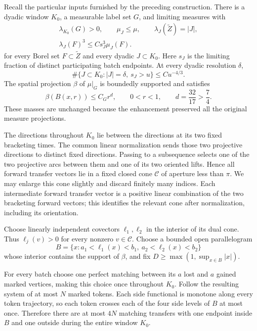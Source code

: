 Recall the particular inputs furnished by the preceding construction.
There is a dyadic window $K_0$, a measurable label set $G$, and limiting
measures with
\begin{equation}
 \begin{gathered}
 \lambda_{K_0}(G)>0,\qquad \mu_J\leq\mu,\qquad
 \lambda_J(\widetilde Z)=|J|,\\
 \lambda_J(F)^3\leq C s_J^3\mu_J(F).
 \end{gathered}
 \label{eq:boundary-measure-input}
\end{equation}
for every Borel set $F\subset\widetilde Z$ and every dyadic $J\subset K_0$.
Here $s_J$ is the limiting fraction of distinct participating batch
endpoints. At every dyadic resolution $\delta$,
\begin{equation}
 \#\{J\subset K_0:|J|=\delta,\ s_J>u\}
 \leq C u^{-4/3}.
 \label{eq:boundary-packing-input}
\end{equation}
The spatial projection $\beta$ of $\mu|_G$ is boundedly supported and
satisfies
\begin{equation}
 \beta(B(x,r))\leq C_G r^d,
 \qquad 0<r<1,
 \qquad d=\frac{32}{17}>\frac74.
 \label{eq:boundary-disk-input}
\end{equation}
These masses are unchanged because the enhancement preserved all the
original measure projections.

The directions throughout $K_0$ lie between the directions at its two
fixed bracketing times. The common linear normalization sends those
two projective directions to distinct fixed directions. Passing to a
subsequence selects one of the two projective arcs between them and
one of its two oriented lifts. Hence all forward transfer vectors lie
in a fixed closed cone $\mathcal C$ of aperture less than $\pi$.
We may enlarge this cone slightly and discard finitely many indices. Each intermediate
forward transfer vector is a positive linear combination of the two
bracketing forward vectors; this identifies the relevant cone after
normalization, including its orientation.

Choose linearly independent covectors $\ell_1,\ell_2$ in the interior
of its dual cone. Thus $\ell_j(v)>0$ for every nonzero
$v\in\mathcal C$. Choose a bounded open parallelogram
\[
 B=\{x:a_1<\ell_1(x)<b_1,\ a_2<\ell_2(x)<b_2\}
\]
whose interior contains the support of $\beta$, and fix
$D\geq\max(1,\sup_{x\in B}|x|)$.

For every batch choose one perfect matching between its $a$ lost and
$a$ gained marked vertices, making this choice once throughout $K_0$.
Follow the resulting system of at most $N$ marked tokens. Each side
functional is monotone along every token trajectory, so each token
crosses each of the four side levels of $B$ at most once. Therefore
there are at most $4N$ matching transfers with one endpoint inside $B$
and one outside during the entire window $K_0$.


